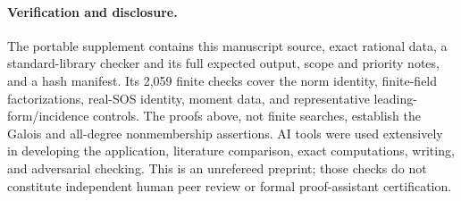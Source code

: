 \documentclass[11pt]{article}
\begin{document}
\paragraph{Verification and disclosure.}
The portable supplement contains this manuscript source, exact rational
data, a standard-library checker and its full expected output, scope and
priority notes, and a hash manifest. Its 2,059 finite checks cover the
norm identity, finite-field factorizations, real-SOS identity, moment
data, and representative leading-form/incidence controls. The proofs
above, not finite searches, establish the Galois and all-degree
nonmembership assertions. AI tools were used extensively in developing
the application, literature comparison, exact computations, writing,
and adversarial checking. This is an unrefereed preprint; those checks
do not constitute independent human peer review or formal
proof-assistant certification.
\end{document}
